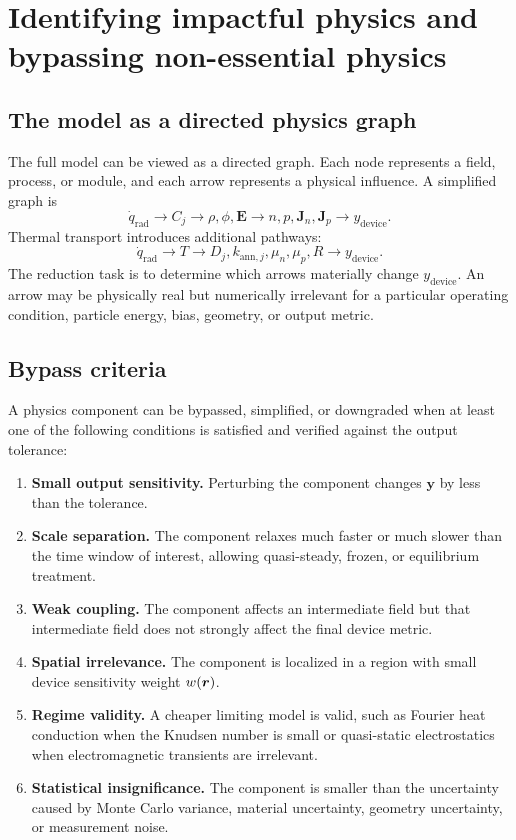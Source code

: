 \documentclass[11pt]{article}
\begin{document}
\section{Identifying impactful physics and bypassing non-essential physics}
\subsection{The model as a directed physics graph}
The full model can be viewed as a directed graph. Each node represents a field, process, or module, and each arrow represents a physical influence. A simplified graph is
\begin{equation}
    \dot{q}_{\mathrm{rad}}
    \to
    C_j
    \to
    \rho,\phi,\bm{E}
    \to
    n,p,\bm{J}_n,\bm{J}_p
    \to
    y_{\mathrm{device}}.
    \label{eq:dominant_path_graph}
\end{equation}
Thermal transport introduces additional pathways:
\begin{equation}
    \dot{q}_{\mathrm{rad}}
    \to
    T
    \to
    D_j,k_{\mathrm{ann},j},\mu_n,\mu_p,R
    \to
    y_{\mathrm{device}}.
    \label{eq:thermal_path_graph}
\end{equation}
The reduction task is to determine which arrows materially change \(y_{\mathrm{device}}\). An arrow may be physically real but numerically irrelevant for a particular operating condition, particle energy, bias, geometry, or output metric.

\subsection{Bypass criteria}
A physics component can be bypassed, simplified, or downgraded when at least one of the following conditions is satisfied and verified against the output tolerance:
\begin{enumerate}[label=\arabic*.]
    \item \textbf{Small output sensitivity.} Perturbing the component changes \(\bm{y}\) by less than the tolerance.
    \item \textbf{Scale separation.} The component relaxes much faster or much slower than the time window of interest, allowing quasi-steady, frozen, or equilibrium treatment.
    \item \textbf{Weak coupling.} The component affects an intermediate field but that intermediate field does not strongly affect the final device metric.
    \item \textbf{Spatial irrelevance.} The component is localized in a region with small device sensitivity weight \(w(\bm{r})\).
    \item \textbf{Regime validity.} A cheaper limiting model is valid, such as Fourier heat conduction when the Knudsen number is small or quasi-static electrostatics when electromagnetic transients are irrelevant.
    \item \textbf{Statistical insignificance.} The component is smaller than the uncertainty caused by Monte Carlo variance, material uncertainty, geometry uncertainty, or measurement noise.
\end{enumerate}
\end{document}
